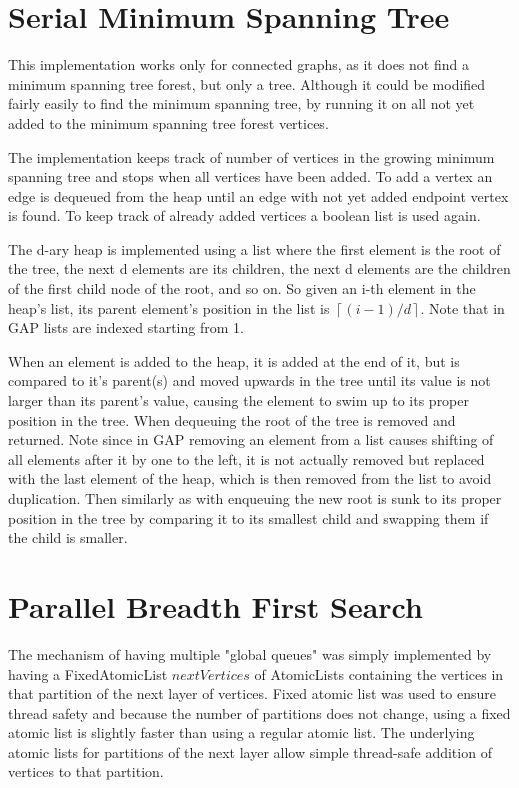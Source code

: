 \documentclass{report}
\theoremstyle{plain}
\theoremstyle{definition}
\theoremstyle{remark}
\begin{document}
\section{Serial Minimum Spanning Tree}

This implementation works only for connected graphs, as it does not find a minimum spanning tree forest, but only a tree. Although it could be modified fairly easily to find the minimum spanning tree, by running it on all not yet added to the minimum spanning tree forest vertices.

The implementation keeps track of number of vertices in the growing minimum spanning tree and stops when all vertices have been added. To add a vertex an edge is dequeued from the heap until an edge with not yet added endpoint vertex is found. To keep track of already added vertices a boolean list is used again.

The d-ary heap is implemented using a list where the first element is the root of the tree, the next d elements are its children, the next d elements are the children of the first child node of the root, and so on. So given an i-th element in the heap's list, its parent element's position in the list is $\left\lceil(i-1)/d\right\rceil$. Note that in GAP lists are indexed starting from 1. 

When an element is added to the heap, it is added at the end of it, but is compared to it's parent(s) and moved upwards in the tree until its value is not larger than its parent's value, causing the element to swim up to its proper position in the tree. When dequeuing the root of the tree is removed and returned. Note since in GAP removing an element from a list causes shifting of all elements after it by one to the left, it is not actually removed but replaced with the last element of the heap, which is then removed from the list to avoid duplication. Then similarly as with enqueuing the new root is sunk to its proper position in the tree by comparing it to its smallest child and swapping them if the child is smaller.

\section{Parallel Breadth First Search}

The mechanism of having multiple "global queues" was simply implemented by having a FixedAtomicList $nextVertices$ of AtomicLists containing the vertices in that partition of the next layer of vertices. Fixed atomic list was used to ensure thread safety and because the number of partitions does not change, using a fixed atomic list is slightly faster than using a regular atomic list. The underlying atomic lists for partitions of the next layer allow simple thread-safe addition of vertices to that partition.
\end{document}
